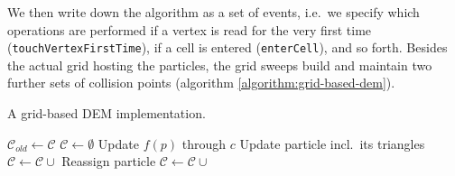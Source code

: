 We then write down the algorithm as a set of events, i.e.~we specify which
operations are performed if a vertex is read for the very first time \linebreak
(\texttt{touchVertexFirstTime}), if a cell is entered
(\texttt{enterCell}), and so forth.
Besides the actual grid hosting the particles, the grid sweeps build and
maintain two further sets of collision points (algorithm \ref{algorithm:grid-based-dem}).

\begin{algorithm}
 \caption{A grid-based DEM implementation.}
 \label{algorithm:grid-based-dem}
 \begin{algorithmic}[1]
   \State $\mathcal{C}_{old} \gets \mathcal{C}$
   \State $\mathcal{C} \gets \emptyset$
       \State Update $f(p)$ through $c$
      \EndFor
      \State Update particle incl.~its triangles
     \EndFor
       \State $\mathcal{C} \gets \mathcal{C} \cup $
     \EndFor
    \EndIf
        \State Reassign particle
       \EndIf
      \EndFor
     \EndFor
      \State $\mathcal{C} \gets \mathcal{C} \cup $
     \EndFor
    \EndIf
   \EndWhile
  \EndFunction

 \end{algorithmic}
\end{algorithm} 


